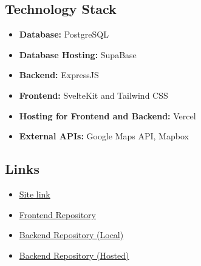 \documentclass[12pt]{article}
\begin{document}
\subsection{Technology Stack}
\begin{itemize}
    \item \textbf{Database:} PostgreSQL
    \item \textbf{Database Hosting:} SupaBase
    \item \textbf{Backend:} ExpressJS
    \item \textbf{Frontend:} SvelteKit and Tailwind CSS
    \item \textbf{Hosting for Frontend and Backend:} Vercel
    \item \textbf{External APIs:} Google Maps API, Mapbox
\end{itemize}

\subsection{Links}
\begin{itemize}
    \item \href{run: https://exploremate.vercel.app}{Site link}
    \item \href{run: https://github.com/BRAINIAC2677/ExploreMate-Frontend}{Frontend Repository}
    \item \href{run: https://github.com/Sadat-Hossain-01/ExploreMate-Backend}{Backend Repository (Local)}
    \item \href{run: https://github.com/BRAINIAC2677/exploremate-express-api}{Backend Repository (Hosted)}
\end{itemize}

    
\end{document}
